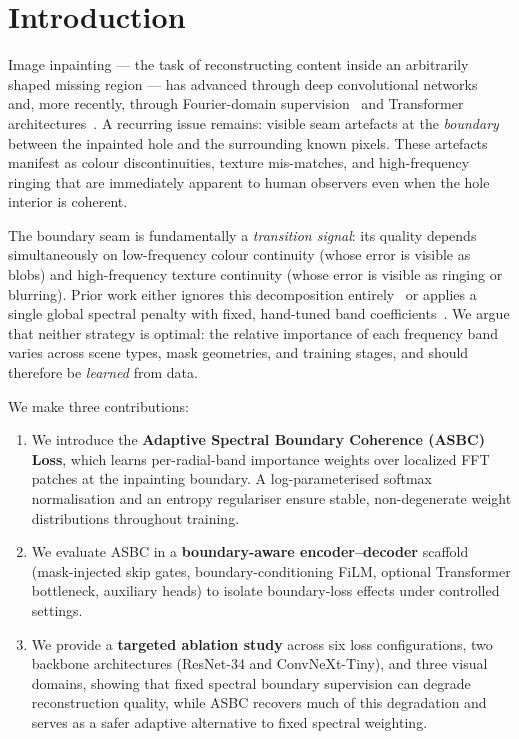 \documentclass[10pt,conference]{IEEEtran}
\begin{document}
\section{Introduction}
\label{sec:intro}

Image inpainting — the task of reconstructing content inside an
arbitrarily shaped missing region — has advanced through
deep convolutional networks~\cite{liu2018partial, yu2019free} and, more
recently, through Fourier-domain supervision~\cite{suvorov2022resolution} and
Transformer architectures~\cite{li2022mat}.  A recurring issue remains: visible seam artefacts
at the \emph{boundary} between the inpainted hole and the surrounding known
pixels.  These artefacts manifest as colour discontinuities, texture
mis-matches, and high-frequency ringing that are immediately apparent to
human observers even when the hole interior is coherent.

The boundary seam is fundamentally a \emph{transition signal}: its quality
depends simultaneously on low-frequency colour continuity (whose error is
visible as blobs) and high-frequency texture continuity (whose error is visible
as ringing or blurring).  Prior work either ignores this decomposition
entirely~\cite{liu2018partial, yu2019free} or applies a single global
spectral penalty with fixed, hand-tuned band coefficients~\cite{suvorov2022resolution}.
We argue that neither strategy is optimal: the relative importance of each
frequency band varies across scene types, mask geometries, and training
stages, and should therefore be \emph{learned} from data.

We make three contributions:

\begin{enumerate}
  \item We introduce the \textbf{Adaptive Spectral Boundary Coherence (ASBC)
  Loss}, which learns per-radial-band importance weights over localized FFT
  patches at the inpainting boundary.  A log-parameterised softmax
  normalisation and an entropy regulariser ensure stable, non-degenerate
  weight distributions throughout training.

  \item We evaluate ASBC in a \textbf{boundary-aware encoder--decoder}
  scaffold (mask-injected skip gates, boundary-conditioning FiLM, optional Transformer
  bottleneck, auxiliary heads) to isolate boundary-loss effects under controlled settings.

  \item We provide a \textbf{targeted ablation study} across six loss
  configurations, two backbone architectures (ResNet-34 and ConvNeXt-Tiny),
  and three visual domains, showing that fixed spectral boundary supervision can
  degrade reconstruction quality, while ASBC recovers much of this degradation
  and serves as a safer adaptive alternative to fixed spectral weighting.
\end{enumerate}
\end{document}
